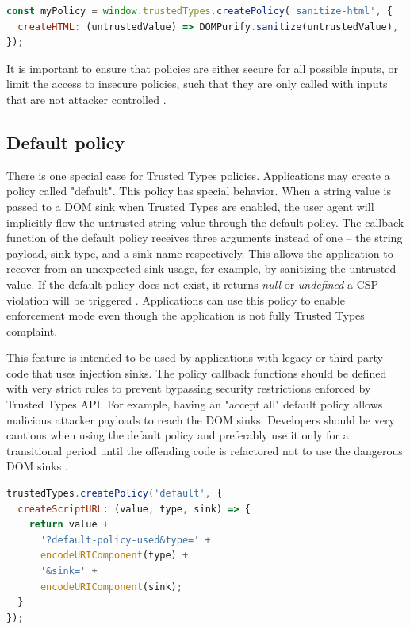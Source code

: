 \vspace{5mm}
\bigskip
\begin{lstlisting}[language=JavaScript, caption=Using a policy to sanitize HTML values]
const myPolicy = window.trustedTypes.createPolicy('sanitize-html', {
  createHTML: (untrustedValue) => DOMPurify.sanitize(untrustedValue),
});
\end{lstlisting}

It is important to ensure that policies are either secure for all possible inputs, or limit the
access to insecure policies, such that they are only called with inputs that are not attacker
controlled \cite{tt_spec:best_practice_policy}.

\subsection{Default policy}

There is one special case for Trusted Types policies. Applications may create a policy called
"default". This policy has special behavior. When a string value is passed to a DOM sink when
Trusted Types are enabled, the user agent will implicitly flow the untrusted string value through
the default policy. The callback function of the default policy receives three arguments instead of
one -- the string payload, sink type, and a sink name respectively. This allows the application to
recover from an unexpected sink usage, for example, by sanitizing the untrusted value. If the
default policy does not exist, it returns \emph{null} or \emph{undefined} a CSP violation will be
triggered \cite{tt_spec:default_policy}. Applications can use this policy to enable enforcement mode
even though the application is not fully Trusted Types complaint.

This feature is intended to be used by applications with legacy or third-party code that uses
injection sinks. The policy callback functions should be defined with very strict rules to prevent
bypassing security restrictions enforced by Trusted Types API. For example, having an "accept all"
default policy allows malicious attacker payloads to reach the DOM sinks. Developers should be very
cautious when using the default policy and preferably use it only for a transitional period until
the offending code is refactored not to use the dangerous DOM sinks \cite{tt_spec:default_policy}.

\vspace{5mm}
\bigskip
\begin{lstlisting}[language=JavaScript, caption=Creating a default policy \cite{tt_spec:default_policy}]
trustedTypes.createPolicy('default', {
  createScriptURL: (value, type, sink) => {
    return value +
      '?default-policy-used&type=' +
      encodeURIComponent(type) +
      '&sink=' +
      encodeURIComponent(sink);
  }
});
\end{lstlisting}

